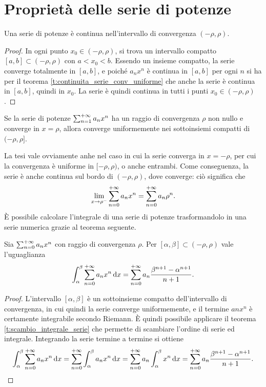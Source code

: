 \section{Proprietà delle serie di potenze}
\begin{teorema}
Una serie di potenze è continua nell'intervallo di convergenza $(-\rho,\rho)$.
\end{teorema}
\begin{proof}
In ogni punto $x_0\in(-\rho,\rho)$, si trova un intervallo compatto $[a,b]\subset(-\rho,\rho)$ con $a<x_0<b$. Essendo un insieme compatto, la serie converge totalmente in $[a,b]$, e poiché $a_nx^n$ è continua in $[a,b]$ per ogni $n$ si ha per il teorema \ref{t:continuita_serie_conv_uniforme} che anche la serie è continua in $[a,b]$, quindi in $x_0$.
La serie è quindi continua in tutti i punti $x_0\in(-\rho,\rho)$. 
\end{proof}
\begin{teorema}[di Abel]
Se la serie di potenze $\sum_{{n}=1}^{+\infty}a_nx^n$ ha un raggio di convergenza $\rho$ non nullo e converge in $x=\rho$, allora converge uniformemente nei sottoinsiemi compatti di $(-\rho,\rho]$.
\end{teorema}
La tesi vale ovviamente anhe nel caso in cui la serie converga in $x=-\rho$, per cui la convergenza è uniforme in $[-\rho,\rho)$, o anche entrambi.
Come conseguenza, la serie è anche continua sul bordo di $(-\rho,\rho)$, dove converge: ciò significa che
\[
\lim_{x\to\rho^-}\sum_{{n}=0}^{+\infty}a_nx^n=\sum_{{n}=0}^{+\infty}a_n\rho^n.
\]
È possibile calcolare l'integrale di una serie di potenze trasformandolo in una serie numerica grazie al teorema seguente.
\begin{teorema}
Sia $\sum_{{n}=0}^{+\infty}a_nx^n$ con raggio di convergenza $\rho$. Per $[\alpha,\beta]\subset(-\rho,\rho)$ vale l'uguaglianza
\[
\int_\alpha^\beta\sum_{{n}=0}^{+\infty}a_nx^n\,\textup{d} x=\sum_{{n}=0}^{+\infty}a_n\frac{\beta^{n+1}-\alpha^{n+1}}{n+1}.
\]
\end{teorema}
\begin{proof}
L'intervallo $[\alpha,\beta]$ è un sottoinsieme compatto dell'intervallo di convergenza, in cui quindi la serie converge uniformemente, e il termine $anx^n$ è certamente integrabile secondo Riemann. È quindi possibile applicare il teorema \ref{t:scambio_integrale_serie} che permette di scambiare l'ordine di serie ed integrale. Integrando la serie termine a termine si ottiene
\[
\int_\alpha^\beta\sum_{{n}=0}^{+\infty}a_nx^n\,\textup{d} x=\sum_{{n}=0}^{+\infty}\int_\alpha^\beta a_nx^n\,\textup{d} x=\sum_{{n}=0}^{+\infty}a_n\int_\alpha^\beta x^n\,\textup{d} x=\sum_{{n}=0}^{+\infty}a_n\frac{\beta^{n+1}-\alpha^{n+1}}{n+1}.
\]
\end{proof}

